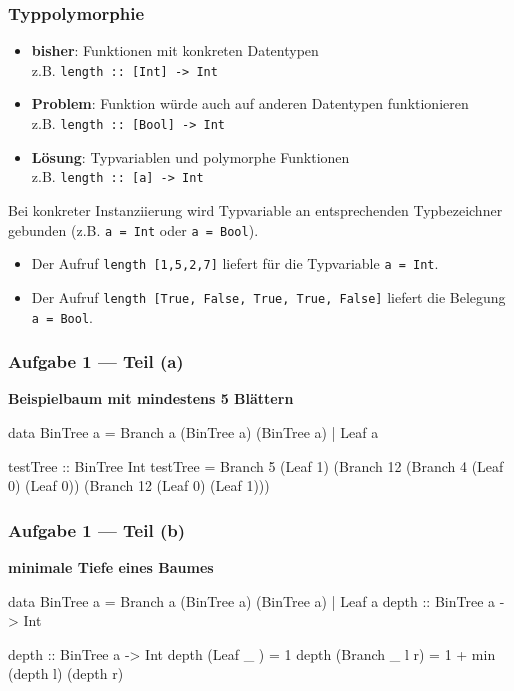 \documentclass{beamer}
\begin{document}
\begin{frame}[fragile, t] \frametitle{Typpolymorphie}
	\footnotesize
	\begin{itemize}
		\item \textbf{bisher}: Funktionen mit konkreten Datentypen \\
		z.B. \texttt{length :: [Int] -> Int}
		\item \textbf{Problem}: Funktion würde auch auf anderen Datentypen funktionieren \\
		z.B. \texttt{length :: [Bool] -> Int}
		\item \textbf{Lösung}: Typvariablen und polymorphe Funktionen \\
		z.B. \texttt{length :: [\alert{a}] -> Int}
	\end{itemize}

	Bei konkreter Instanziierung wird Typvariable an entsprechenden Typbezeichner gebunden (z.B. \texttt{\alert{a} = Int} oder \texttt{\alert{a} = Bool}).
	
	\begin{itemize}
		\item Der Aufruf \texttt{length [1,5,2,7]} liefert für die Typvariable \texttt{\alert{a} = Int}.
		\item Der Aufruf \texttt{length [True, False, True, True, False]} liefert die Belegung \texttt{\alert{a} = Bool}.
	\end{itemize}
\end{frame}


\begin{frame}[fragile, t] \frametitle{Aufgabe 1 --- Teil (a)}
	\textbf{Beispielbaum mit mindestens 5 Blättern} \\[6pt]
	\begin{codebox}
data BinTree a = Branch a (BinTree a) (BinTree a) 
                 | Leaf a
	\end{codebox}
	\pause
	\begin{codebox}
testTree :: BinTree Int
testTree = Branch 5
             (Leaf 1)
             (Branch 12
                (Branch 4
                   (Leaf 0)
                   (Leaf 0))
                (Branch 12
                   (Leaf 0)
                   (Leaf 1)))
	\end{codebox}
\end{frame}

\begin{frame}[fragile, t] \frametitle{Aufgabe 1 --- Teil (b)}
	\textbf{minimale Tiefe eines Baumes}
	
	\begin{codebox}
data BinTree a = Branch a (BinTree a) (BinTree a) 
                 | Leaf a
depth :: BinTree a -> Int
	\end{codebox}
	
	\bigskip \pause
	
	\begin{codebox}
depth :: BinTree a -> Int
depth (Leaf   _    ) = 1
depth (Branch _ l r) = 1 + min (depth l) (depth r)
	\end{codebox}
\end{frame}
\end{document}
